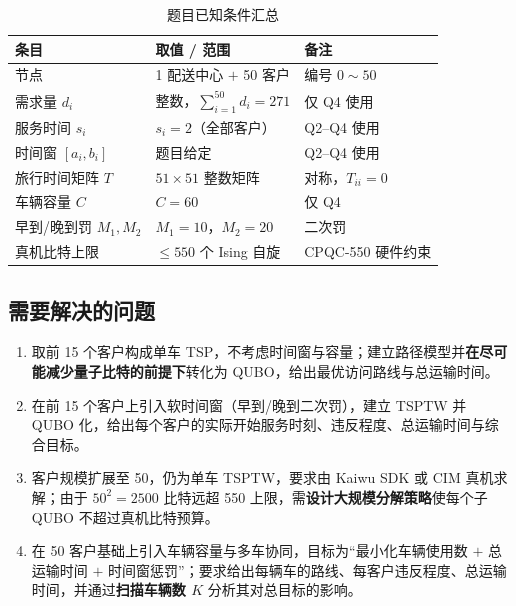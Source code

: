 \documentclass[UTF8,12pt,a4paper]{ctexart}
\begin{document}
\begin{table}[H]
    \centering
    \caption{题目已知条件汇总}
    \label{tab:given}
    \begin{tabular}{l l l}
        \toprule
        条目 & 取值 / 范围 & 备注 \\
        \midrule
        节点                  & 1 配送中心 $+$ 50 客户            & 编号 $0\sim50$ \\
        需求量 $d_i$           & 整数，$\sum_{i=1}^{50}d_i=271$    & 仅 Q4 使用 \\
        服务时间 $s_i$         & $s_i=2$（全部客户）               & Q2--Q4 使用 \\
        时间窗 $[a_i,b_i]$     & 题目给定                          & Q2--Q4 使用 \\
        旅行时间矩阵 $T$       & $51\!\times\!51$ 整数矩阵          & 对称，$T_{ii}=0$ \\
        车辆容量 $C$          & $C=60$                            & 仅 Q4 \\
        早到/晚到罚 $M_1,M_2$  & $M_1=10$，$M_2=20$               & 二次罚 \\
        真机比特上限           & $\le 550$ 个 Ising 自旋           & CPQC-550 硬件约束 \\
        \bottomrule
    \end{tabular}
\end{table}

\subsection{需要解决的问题}

\begin{enumerate}
    \item[\textbf{问题一}] 取前 15 个客户构成单车 TSP，不考虑时间窗与容量；建立路径模型并\textbf{在尽可能减少量子比特的前提下}转化为 QUBO，给出最优访问路线与总运输时间。
    \item[\textbf{问题二}] 在前 15 个客户上引入软时间窗（早到/晚到二次罚），建立 TSPTW 并 QUBO 化，给出每个客户的实际开始服务时刻、违反程度、总运输时间与综合目标。
    \item[\textbf{问题三}] 客户规模扩展至 50，仍为单车 TSPTW，要求由 Kaiwu SDK 或 CIM 真机求解；由于 $50^{2}=2500$ 比特远超 550 上限，需\textbf{设计大规模分解策略}使每个子 QUBO 不超过真机比特预算。
    \item[\textbf{问题四}] 在 50 客户基础上引入车辆容量与多车协同，目标为``最小化车辆使用数 $+$ 总运输时间 $+$ 时间窗惩罚''；要求给出每辆车的路线、每客户违反程度、总运输时间，并通过\textbf{扫描车辆数 $K$} 分析其对总目标的影响。
\end{enumerate}
\end{document}
